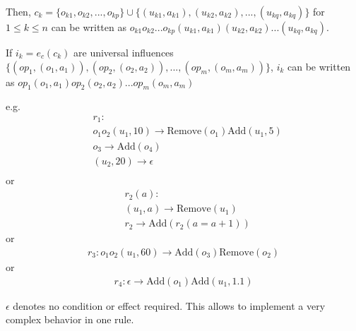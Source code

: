 \documentclass[9pt,a4paper,twoside]{article}
\begin{document}
            Then, $c_k = \{o_{k1},o_{k2},...,o_{kp}\} \cup \{(u_{k1},a_{k1}), (u_{k2},a_{k2}),..., (u_{kq},a_{kq})\}$ for $1 \leq k \leq n$ can be written as 
            $o_{k1}o_{k2}...o_{kp}(u_{k1}, a_{k1})(u_{k2}, a_{k2})...(u_{kq}, a_{kq})$.
            
            If $i_k = e_c(c_k)$ are universal influences $\{ (op_1, (o_1,a_1)), (op_2, (o_2,a_2)),...,(op_m, (o_m,a_m))  \}$, 
            $i_k$ can be written as $op_1(o_1, a_1)op_2(o_2, a_2)...op_m(o_m, a_m)$
            
            e.g. 
            \begin{equation}
                \begin{align}
                    &r_1: \\
                    &o_1o_2(u_1, 10) \rightarrow \text{Remove}(o_1)\text{Add}(u_1, 5)  \\
                    &o_3 \rightarrow \text{Add}(o_4) \\
                    &(u_2, 20) \rightarrow \epsilon \\
                \end{align}
            \end{equation}
            or
            \begin{equation}
                \begin{align}
                    &r_2(a): \\
                    &(u_1, a) \rightarrow \text{Remove}(u_1) \\
                    &r_2 \rightarrow \text{Add}(r_2(a = a + 1))
                \end{align}
            \end{equation}
            or
            \begin{equation}
                \begin{align}
                    r_3: o_1o_2(u_1, 60) \rightarrow \text{Add}(o_3)\text{Remove}(o_2)
                \end{align}
            \end{equation}
            or
            \begin{equation}
                \begin{align}
                    r_4:\epsilon \rightarrow \text{Add}(o_1)\text{Add}(u_1, 1.1)
                \end{align}
            \end{equation}

            $\epsilon$ denotes no condition or effect required.
            This allows to implement a very complex behavior in one rule.
\end{document}
